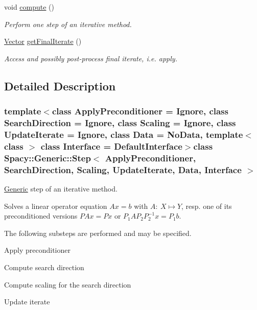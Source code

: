 \begin{DoxyCompactItemize}
\item 
void \hyperlink{classSpacy_1_1Generic_1_1Step_ac400c25a81a5138b4926bbb99692b343}{compute} ()
\begin{DoxyCompactList}\small\item\em Perform one step of an iterative method. \end{DoxyCompactList}\item 
\hyperlink{classSpacy_1_1Generic_1_1Vector}{Vector} \hyperlink{classSpacy_1_1Generic_1_1Step_a5be9a8afa47319b645b2df73b3b23acc}{get\-Final\-Iterate} ()
\begin{DoxyCompactList}\small\item\em Access and possibly post-\/process final iterate, i.\-e. apply. \end{DoxyCompactList}\end{DoxyCompactItemize}


\subsection{Detailed Description}
\subsubsection*{template$<$class Apply\-Preconditioner = Ignore, class Search\-Direction = Ignore, class Scaling = Ignore, class Update\-Iterate = Ignore, class Data = No\-Data, template$<$ class $>$ class Interface = Default\-Interface$>$class Spacy\-::\-Generic\-::\-Step$<$ Apply\-Preconditioner, Search\-Direction, Scaling, Update\-Iterate, Data, Interface $>$}

\hyperlink{namespaceSpacy_1_1Generic}{Generic} step of an iterative method. 

Solves a linear operator equation $Ax=b$ with $A:\ X\mapsto Y$, resp. one of its preconditioned versions $PAx=Px$ or $P_1AP_2P_2^{-1}x=P_1b$.

The following substeps are performed and may be specified.
\begin{DoxyEnumerate}
\item Apply preconditioner
\item Compute search direction
\item Compute scaling for the search direction
\item Update iterate 
\end{DoxyEnumerate}

